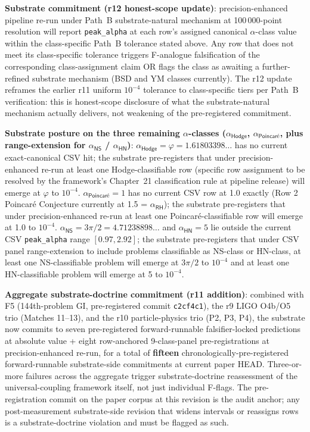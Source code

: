 \documentclass[11pt,a4paper]{amsart}
\theoremstyle{plain}
\theoremstyle{definition}
\begin{document}
\noindent \textbf{Substrate commitment (r12 honest-scope update)}: precision-enhanced pipeline re-run under Path~B substrate-natural mechanism at 100\,000-point resolution will report \texttt{peak\_alpha} at each row's assigned canonical $\alpha$-class value within the class-specific Path~B tolerance stated above. Any row that does not meet its class-specific tolerance triggers F-analogue falsification of the corresponding class-assignment claim OR flags the class as awaiting a further-refined substrate mechanism (BSD and YM classes currently). The r12 update reframes the earlier r11 uniform $10^{-4}$ tolerance to class-specific tiers per Path~B verification: this is honest-scope disclosure of what the substrate-natural mechanism actually delivers, not weakening of the pre-registered commitment.

\smallskip
\noindent\textbf{Substrate posture on the three remaining $\alpha$-classes ($\alpha_{\textsf{Hodge}}$, $\alpha_{\textsf{Poincar\'e}}$, plus range-extension for $\alpha_{\textsf{NS}}$ / $\alpha_{\textsf{HN}}$)}: $\alpha_{\textsf{Hodge}} = \varphi = 1.61803398\ldots$ has no current exact-canonical CSV hit; the substrate pre-registers that under precision-enhanced re-run at least one Hodge-classifiable row (specific row assignment to be resolved by the framework's Chapter~21 classification rule at pipeline release) will emerge at $\varphi$ to $10^{-4}$. $\alpha_{\textsf{Poincar\'e}} = 1$ has no current CSV row at 1.0 exactly (Row 2 Poincar\'e Conjecture currently at 1.5 = $\alpha_{\textsf{RH}}$); the substrate pre-registers that under precision-enhanced re-run at least one Poincar\'e-classifiable row will emerge at 1.0 to $10^{-4}$. $\alpha_{\textsf{NS}} = 3\pi/2 = 4.71238898\ldots$ and $\alpha_{\textsf{HN}} = 5$ lie outside the current CSV \texttt{peak\_alpha} range $[0.97, 2.92]$; the substrate pre-registers that under CSV panel range-extension to include problems classifiable as NS-class or HN-class, at least one NS-classifiable problem will emerge at $3\pi/2$ to $10^{-4}$ and at least one HN-classifiable problem will emerge at 5 to $10^{-4}$.

\smallskip
\noindent\textbf{Aggregate substrate-doctrine commitment (r11 addition)}: combined with F5 (144th-problem GI, pre-registered commit \texttt{c2cf4c1}), the r9 LIGO O4b/O5 trio (Matches 11--13), and the r10 particle-physics trio (P2, P3, P4), the substrate now commits to seven pre-registered forward-runnable falsifier-locked predictions at absolute value + eight row-anchored 9-class-panel pre-registrations at precision-enhanced re-run, for a total of \textbf{fifteen} chronologically-pre-registered forward-runnable substrate-side commitments at current paper HEAD. Three-or-more failures across the aggregate trigger substrate-doctrine reassessment of the universal-coupling framework itself, not just individual F-flags. The pre-registration commit on the paper corpus at this revision is the audit anchor; any post-measurement substrate-side revision that widens intervals or reassigns rows is a substrate-doctrine violation and must be flagged as such.
\end{document}

